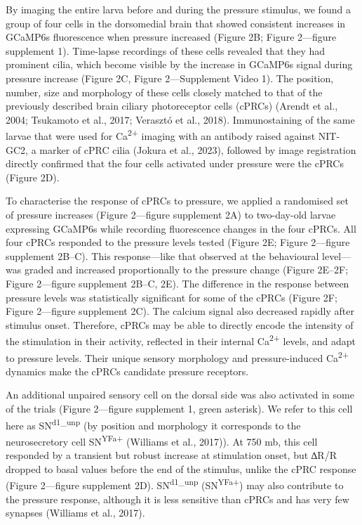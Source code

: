 \documentclass[
  11pt,
]{article}
\begin{document}
By imaging the entire larva before and during the pressure stimulus, we
found a group of four cells in the dorsomedial brain that showed
consistent increases in GCaMP6s fluorescence when pressure increased
(Figure 2B; Figure 2---figure supplement 1). Time-lapse recordings of
these cells revealed that they had prominent cilia, which become visible
by the increase in GCaMP6s signal during pressure increase (Figure 2C,
Figure 2---Supplement Video 1). The position, number, size and
morphology of these cells closely matched to that of the previously
described brain ciliary photoreceptor cells (cPRCs) (Arendt et al.,
2004; Tsukamoto et al., 2017; Verasztó et al., 2018). Immunostaining of
the same larvae that were used for Ca\textsuperscript{2+} imaging with
an antibody raised against NIT-GC2, a marker of cPRC cilia (Jokura et
al., 2023), followed by image registration directly confirmed that the
four cells activated under pressure were the cPRCs (Figure 2D).

To characterise the response of cPRCs to pressure, we applied a
randomised set of pressure increases (Figure 2---figure supplement 2A)
to two-day-old larvae expressing GCaMP6s while recording fluorescence
changes in the four cPRCs. All four cPRCs responded to the pressure
levels tested (Figure 2E; Figure 2---figure supplement 2B--C). This
response---like that observed at the behavioural level---was graded and
increased proportionally to the pressure change (Figure 2E--2F; Figure
2---figure supplement 2B--C, 2E). The difference in the response between
pressure levels was statistically significant for some of the cPRCs
(Figure 2F; Figure 2---figure supplement 2C). The calcium signal also
decreased rapidly after stimulus onset. Therefore, cPRCs may be able to
directly encode the intensity of the stimulation in their activity,
reflected in their internal Ca\textsuperscript{2+} levels, and adapt to
pressure levels. Their unique sensory morphology and pressure-induced
Ca\textsuperscript{2+} dynamics make the cPRCs candidate pressure
receptors.

An additional unpaired sensory cell on the dorsal side was also
activated in some of the trials (Figure 2---figure supplement 1, green
asterisk). We refer to this cell here as SN\textsuperscript{d1\_unp} (by
position and morphology it corresponds to the neurosecretory cell
SN\textsuperscript{YFa+} (Williams et al., 2017)). At 750 mb, this cell
responded by a transient but robust increase at stimulation onset, but
∆R/R dropped to basal values before the end of the stimulus, unlike the
cPRC response (Figure 2---figure supplement 2D).
SN\textsuperscript{d1\_unp} (SN\textsuperscript{YFa+}) may also
contribute to the pressure response, although it is less sensitive than
cPRCs and has very few synapses (Williams et al., 2017).
\end{document}
